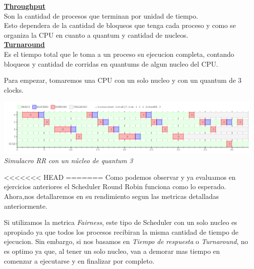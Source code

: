 \textbf{\underline{Throughput}}\\
Son la cantidad de procesos que terminan por unidad de tiempo.\\
Esto dependera de la cantidad de bloqueos que tenga cada proceso y como se organiza la CPU en cuanto a quantum y cantidad de nucleos.\\

\textbf{\underline{Turnaround}}\\
Es el tiempo total que le toma a un proceso su ejecucion completa, contando bloqueos y cantidad de corridas en quantums de algun nucleo del CPU.

\vspace{1 cm}
Para empezar, tomaremos una CPU con un solo nucleo y con un quantum de 3 clocks.\\

\vspace{\baselineskip}
\begin{center}
\includegraphics[scale=0.45]{../tp1/Test/resEj7Co1.png}
\\
\vspace{1pt}
\footnotesize\textit{Simulacro RR con un n\'ucleo de quantum 3}
\end{center}
\vspace{\baselineskip}

<<<<<<< HEAD
=======
Como podemos observar y ya evaluamos en ejercicios anteriores el Scheduler Round Robin funciona como lo esperado.
Ahora,nos detallaremos en su rendimiento segun las metricas detalladas anteriormente.

Si utilizamos la metrica \textit{Fairness}, este tipo de Scheduler con un solo nucleo es apropiado ya que todos los procesos recibiran la misma cantidad de tiempo de ejecucion.
Sin embargo, si nos basamos en \textit{Tiempo de respuesta} o \textit{Turnaround}, no es optimo ya que, al tener un solo nucleo, van a demorar mas tiempo en comenzar a ejecutarse y en finalizar por completo.

